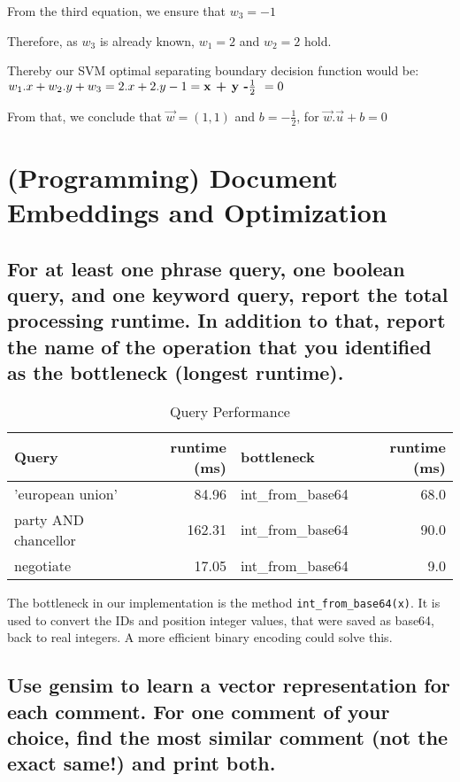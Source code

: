 \documentclass{scrartcl}
\begin{document}
From the third equation, we ensure that $w_3 = -1$

Therefore, as $w_3$ is already known, $w_1 = 2$ and $w_2 = 2$ hold.

Thereby our SVM optimal separating boundary decision function would be: $w_1 . x+ w_2 . y + w_3 = 2.x + 2.y - 1 = \textbf{x + y -$ \frac{1}{2}$ } = 0 $

From that, we conclude that $\vec{w} = (1,1) $ and $b =  - \frac{1}{2}$, for $\vec{w} . \vec{u} +b  = 0$ 


\section{(Programming) Document Embeddings and Optimization}

\subsection{For at least one phrase query, one boolean query, and one keyword query, report the total processing runtime. In addition to that, report the name of the operation that you identified as the bottleneck (longest runtime).}

\begin{table}[h]
	\centering
	\caption{Query Performance}
	\begin{tabular}{l|r|l|r}
		Query                & runtime (ms) & bottleneck         & runtime (ms)  \\ \hline
		'european union'     &        84.96 & int\_from\_base64  & 68.0  \\
		party AND chancellor &       162.31 & int\_from\_base64  & 90.0  \\
		negotiate            &        17.05 & int\_from\_base64  &  9.0  \\
	\end{tabular}
\end{table}

The bottleneck in our implementation is the method \texttt{int\_from\_base64(x)}. It is used to convert the IDs and position integer values, that were saved as base64, back to real integers. A more efficient binary encoding could solve this.

\subsection{Use gensim to learn a vector representation for each comment. For one comment of your choice, find the most similar comment (not the exact same!) and print both.}
\end{document}
